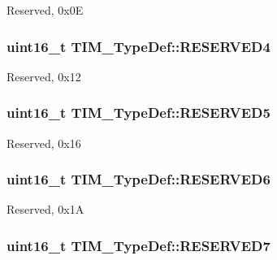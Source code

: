 Reserved, 0x0\-E \hypertarget{struct_t_i_m___type_def_a36afe894c9b0878347d0c038c80e4c22}{
\subsubsection[{R\-E\-S\-E\-R\-V\-E\-D4}]{\setlength{\rightskip}{0pt plus 5cm}uint16\-\_\-t T\-I\-M\-\_\-\-Type\-Def\-::\-R\-E\-S\-E\-R\-V\-E\-D4}}\label{struct_t_i_m___type_def_a36afe894c9b0878347d0c038c80e4c22}
Reserved, 0x12 \hypertarget{struct_t_i_m___type_def_a15944db86d7a7a69db35512f68eca15c}{
\subsubsection[{R\-E\-S\-E\-R\-V\-E\-D5}]{\setlength{\rightskip}{0pt plus 5cm}uint16\-\_\-t T\-I\-M\-\_\-\-Type\-Def\-::\-R\-E\-S\-E\-R\-V\-E\-D5}}\label{struct_t_i_m___type_def_a15944db86d7a7a69db35512f68eca15c}
Reserved, 0x16 \hypertarget{struct_t_i_m___type_def_a7fd09a4911f813464a454b507832a0b9}{
\subsubsection[{R\-E\-S\-E\-R\-V\-E\-D6}]{\setlength{\rightskip}{0pt plus 5cm}uint16\-\_\-t T\-I\-M\-\_\-\-Type\-Def\-::\-R\-E\-S\-E\-R\-V\-E\-D6}}\label{struct_t_i_m___type_def_a7fd09a4911f813464a454b507832a0b9}
Reserved, 0x1\-A \hypertarget{struct_t_i_m___type_def_a4157fa8f6e188281292f019ea24f5599}{
\subsubsection[{R\-E\-S\-E\-R\-V\-E\-D7}]{\setlength{\rightskip}{0pt plus 5cm}uint16\-\_\-t T\-I\-M\-\_\-\-Type\-Def\-::\-R\-E\-S\-E\-R\-V\-E\-D7}}\label{struct_t_i_m___type_def_a4157fa8f6e188281292f019ea24f5599}
